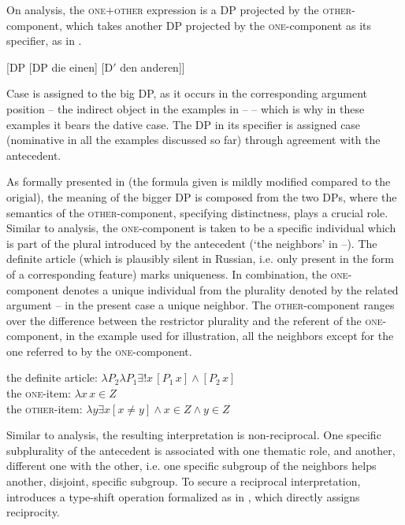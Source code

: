 \documentclass[output=paper,colorlinks,citecolor=brown]{langscibook}
\begin{document}
On  analysis, the \textsc{one$+$other} expression is a DP projected by the \textsc{other}-component, which takes another DP projected by the \textsc{one}-component as its specifier, as in .

\ea\label{ex:arsenijevic:DP}
[DP [DP die einen] [D$'$ den anderen]]
\z

\noindent Case is assigned to the big DP, as it occurs in the corresponding argument position -- the indirect object in the examples in -- -- which is why in these examples it bears the dative case. The DP in its specifier is assigned case (nominative in all the examples discussed so far) through agreement with the antecedent.

As formally presented in  (the formula given is mildly modified compared to the origial), the meaning of the bigger DP is composed from the two DPs, where the semantics of the \textsc{other}-component, specifying distinctness, plays a crucial role. Similar to  analysis, the \textsc{one}-component is taken to be a specific individual which is part of the plural introduced by the antecedent (`the neighbors' in --). The definite article (which is plausibly silent in Russian, i.e. only present in the form of a corresponding feature) marks uniqueness. In combination, the \textsc{one}-component denotes a unique individual from the plurality denoted by the related argument -- in the present case a unique neighbor. The \textsc{other}-component ranges over the difference between the restrictor plurality and the referent of the \textsc{one}-component, in the example used for illustration, all the neighbors except for the one referred to by the \textsc{one}-component.

\ea\label{ex:arsenijevic:Definite}
\ea the definite article: $\lambda P_2 \lambda P_1 \exists ! x \, [P_1 \, x] \wedge [P_2 \, x]$\\
\ex the \textsc{one}-item: $\lambda x \, x \in Z$\\
\ex the \textsc{other}-item: $\lambda y \exists x [x \neq y] \wedge x \in Z \wedge y \in Z$
\z \z

\noindent Similar to  %
analysis, the resulting interpretation is non-reciprocal. One specific subplurality of the antecedent is associated with one thematic role, and another, different one with the other, i.e. one specific subgroup of the neighbors helps another, disjoint, specific subgroup. To secure a reciprocal interpretation, \citet{z14} %
introduces a type-shift operation formalized as in , which directly assigns reciprocity.
\end{document}

